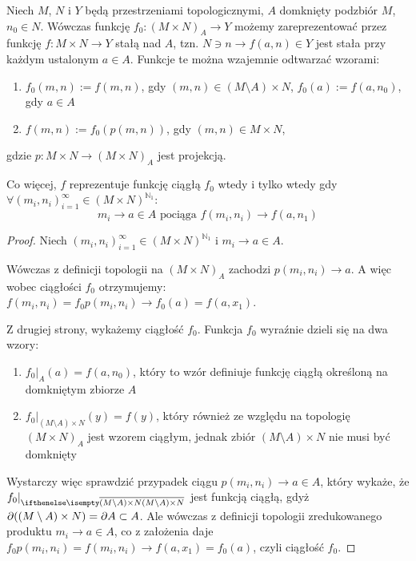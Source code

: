 \begin{lem} \label{lem:reduced-product-continuous}
  Niech $M$, $N$ i $Y$ będą przestrzeniami topologicznymi, $A$ domknięty podzbiór $M$, $n_0 \in N$. Wówczas funkcję $f_0: (M \times N)_A \rightarrow Y$ możemy zareprezentować przez funkcję $f: M \times N \rightarrow Y$ stałą nad $A$, tzn. $N \ni n \rightarrow f(a, n) \in Y$ jest stała przy każdym ustalonym $a \in A$. Funkcje te można wzajemnie odtwarzać wzorami:
  \begin{enumerate}
   \item $f_0(m,n) := f(m,n)$, gdy $(m,n) \in (M \setminus A) \times N$, $f_0(a) := f(a, n_0)$, gdy $a \in A$
   \item $f(m,n) := f_0(p(m,n))$, gdy $(m,n) \in M \times N$,
  \end{enumerate}
  gdzie $p: M\times N \to (M\times N)_A$ jest projekcją.

  
  Co więcej, $f$ reprezentuje funkcję ciągłą $f_0$ wtedy i tylko wtedy gdy $\forall (m_i, n_i)_{i=1}^\infty \in (M \times N)^{\mathbb{N}_1}:$
  \[m_i \rightarrow a \in A \mbox{ pociąga } f(m_i, n_i) \rightarrow f(a, n_1)\]
  
  \begin{proof}
    Niech $(m_i, n_i)_{i=1}^\infty \in (M \times N)^{\mathbb{N}_1}$ i $m_i \rightarrow a \in A$.
    
    Wówczas z definicji topologii na $(M \times N)_A$ zachodzi $p(m_i, n_i) \rightarrow a$. A więc wobec ciągłości $f_0$ otrzymujemy: $f(m_i, n_i) = f_0 p(m_i, n_i) \rightarrow f_0(a) = f(a, x_1)$.
    
    Z drugiej strony, wykażemy ciągłość $f_0$. Funkcja $f_0$ wyraźnie dzieli się na dwa wzory:
    \begin{enumerate}
     \item $f_0|_A(a) = f(a, n_0)$, który to wzór definiuje funkcję ciągłą określoną na domkniętym zbiorze $A$
     \item $f_0|_{(M \setminus A) \times N}(y) = f(y)$, który również ze względu na topologię $(M \times N)_A$ jest wzorem ciągłym, jednak zbiór $(M \setminus A) \times N$ nie musi być domknięty
    \end{enumerate}
    Wystarczy więc sprawdzić przypadek ciągu $p(m_i, n_i) \rightarrow a \in A$, który wykaże, że $f_0|_{\cl{(M \setminus A) \times N}}$ jest funkcją ciągłą, gdyż $\partial((M \setminus A) \times N) = \partial A \subset A$. Ale wówczas z definicji topologii zredukowanego produktu $m_i \rightarrow a \in A$, co z założenia daje $f_0 p(m_i, n_i) = f(m_i, n_i) \rightarrow f(a, x_1) = f_0(a)$, czyli ciągłość $f_0$.
  \end{proof}
\end{lem}

